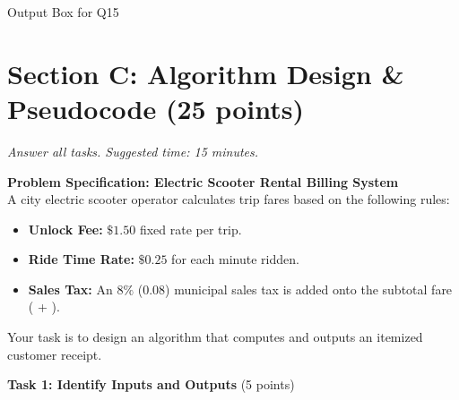 \documentclass[11pt,a4paper]{article}
\begin{document}
\begin{answerbox}[height=1.8cm]{Output Box for Q15}

\vspace{0.03cm}

\end{answerbox}





\newpage

\section*{Section C: Algorithm Design \& Pseudocode \hfill \normalsize\normalfont(25 points)}

\textit{Answer all tasks. Suggested time: 15 minutes.}

\begin{tcolorbox}[colback=boxbg, colframe=secondaryteal, arc=1.5mm]

\textbf{Problem Specification: Electric Scooter Rental Billing System}\\[0.1cm]

A city electric scooter operator calculates trip fares based on the following rules:

\begin{itemize}[noitemsep]

  \item \textbf{Unlock Fee:} $\$1.50$ fixed rate per trip.

  \item \textbf{Ride Time Rate:} $\$0.25$ for each minute ridden.

  \item \textbf{Sales Tax:} An $8\%$ ($0.08$) municipal sales tax is added onto the subtotal fare ( + ).

\end{itemize}

Your task is to design an algorithm that computes and outputs an itemized customer receipt.

\end{tcolorbox}

\vspace{0.08cm}

\noindent\textbf{Task 1: Identify Inputs and Outputs} (5 points)
\end{document}
